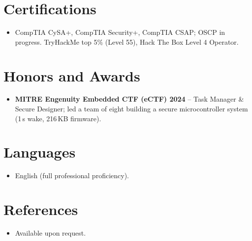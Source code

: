 \documentclass[11pt,a4paper,sans]{moderncv}
\begin{document}

\section{Certifications}
\vspace{1pt}
\begin{itemize}
\item {CompTIA CySA+, CompTIA Security+, CompTIA CSAP; OSCP in progress. TryHackMe top 5\% (Level 55), Hack The Box Level 4 Operator.}
\end{itemize}


\section{Honors and Awards}
\vspace{1pt}
\begin{itemize}
\item{\textbf{MITRE Engenuity Embedded CTF (eCTF) 2024} -- Task Manager \& Secure Designer; led a team of eight building a secure microcontroller system (1\,s wake, 216\,KB firmware).}
\end{itemize}


\section{Languages}
\vspace{1pt}
\begin{itemize}
\item {English (full professional proficiency).}
\end{itemize}


\section{References}
\vspace{1pt}
\begin{itemize}
\item{Available upon request.}
\end{itemize}
\end{document}
